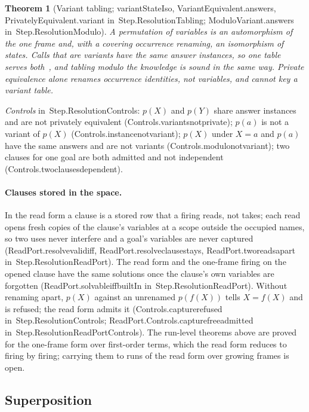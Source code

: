 \documentclass[11pt]{article}
\newtheorem{theorem}{Theorem}
\theoremstyle{remark}
\newcommand{\lean}[1]{{\ttfamily\def\_{\textunderscore\allowbreak}#1}}
\newcommand{\inmod}[1]{in~{\ttfamily\def\_{\textunderscore\allowbreak}#1}}
\begin{document}
\begin{theorem}[Variant tabling; \lean{variantStateIso}, \lean{VariantEquivalent.answers}, \lean{PrivatelyEquivalent.variant} \inmod{Step.ResolutionTabling}; \lean{ModuloVariant.answers} \inmod{Step.ResolutionModulo}]
A permutation of variables is an automorphism of the one frame and, with a covering occurrence
renaming, an isomorphism of states. Calls that are variants have the same answer instances, so one table
serves both~\cite{tamakisato86}, and tabling modulo the knowledge is sound in the same way. Private
equivalence alone renames occurrence identities, not variables, and cannot key a variant table.
\end{theorem}
\emph{Controls} \inmod{Step.ResolutionControls}: $p(X)$ and $p(Y)$ share answer instances and are not
privately equivalent (\lean{Controls.variants\_not\_private}); $p(a)$ is not a variant of $p(X)$
(\lean{Controls.instance\_not\_variant}); $p(X)$ under $X=a$ and $p(a)$ have the same answers and are not
variants (\lean{Controls.modulo\_not\_variant}); two clauses for one goal are both admitted and not
independent (\lean{Controls.two\_clauses\_dependent}).

\paragraph{Clauses stored in the space.} In the read form a clause is a stored row that a firing reads,
not takes; each read opens fresh copies of the clause's variables at a scope outside the occupied
names, so two uses never interfere and a goal's variables are never captured
(\lean{ReadPort.resolve\_valid\_iff}, \lean{ReadPort.resolve\_clause\_stays}, \lean{ReadPort.two\_reads\_apart}
\inmod{Step.ResolutionReadPort}). The read form and the one-frame firing on the opened clause have the same
solutions once the clause's own variables are forgotten (\lean{ReadPort.solvable\_iff\_builtIn} \inmod{Step.ResolutionReadPort}). Without
renaming apart, $p(X)$ against an unrenamed $p(f(X))$ tells $X = f(X)$ and is refused; the read form
admits it (\lean{Controls.capture\_refused} \inmod{Step.ResolutionControls};
\lean{ReadPort.Controls.capture\_free\_admitted} \inmod{Step.ResolutionReadPortControls}). The run-level
theorems above are proved for the one-frame form over first-order terms, which the read form reduces to
firing by firing; carrying them to runs of the read form over growing frames is open.

\subsection{Superposition}
\end{document}
